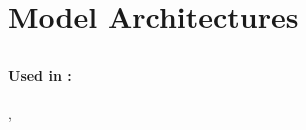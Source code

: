 \documentclass[10pt]{article}
\begin{document}

\section{Model Architectures}
\subsection{
            \label{model:\VAR{model['modelname']}}
            }
\paragraph{Used in \No{}:}
    \hyperref[training:\VAR{summaries[k]['model']['reportnumber']}]
             {},
    \hyperref[training:\VAR{summaries[-1]['model']['reportnumber']}]
             {}
\vspace{-2ex}
%
\end{document}
